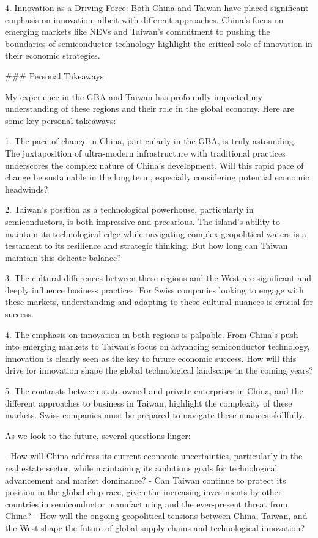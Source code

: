 4. Innovation as a Driving Force: Both China and Taiwan have placed significant emphasis on innovation, albeit with different approaches. China's focus on emerging markets like NEVs and Taiwan's commitment to pushing the boundaries of semiconductor technology highlight the critical role of innovation in their economic strategies.

### Personal Takeaways

My experience in the GBA and Taiwan has profoundly impacted my understanding of these regions and their role in the global economy. Here are some key personal takeaways:

1. The pace of change in China, particularly in the GBA, is truly astounding. The juxtaposition of ultra-modern infrastructure with traditional practices underscores the complex nature of China's development. Will this rapid pace of change be sustainable in the long term, especially considering potential economic headwinds?

2. Taiwan's position as a technological powerhouse, particularly in semiconductors, is both impressive and precarious. The island's ability to maintain its technological edge while navigating complex geopolitical waters is a testament to its resilience and strategic thinking. But how long can Taiwan maintain this delicate balance?

3. The cultural differences between these regions and the West are significant and deeply influence business practices. For Swiss companies looking to engage with these markets, understanding and adapting to these cultural nuances is crucial for success.

4. The emphasis on innovation in both regions is palpable. From China's push into emerging markets to Taiwan's focus on advancing semiconductor technology, innovation is clearly seen as the key to future economic success. How will this drive for innovation shape the global technological landscape in the coming years?

5. The contrasts between state-owned and private enterprises in China, and the different approaches to business in Taiwan, highlight the complexity of these markets. Swiss companies must be prepared to navigate these nuances skillfully.

As we look to the future, several questions linger:

- How will China address its current economic uncertainties, particularly in the real estate sector, while maintaining its ambitious goals for technological advancement and market dominance?
- Can Taiwan continue to protect its position in the global chip race, given the increasing investments by other countries in semiconductor manufacturing and the ever-present threat from China?
- How will the ongoing geopolitical tensions between China, Taiwan, and the West shape the future of global supply chains and technological innovation?

